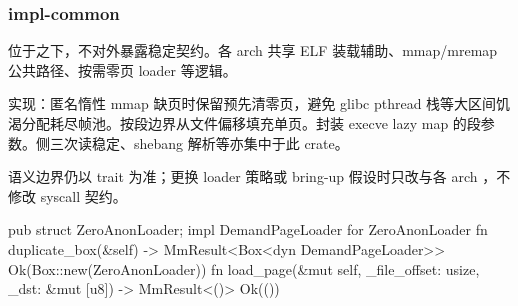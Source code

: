 
\subsubsection{impl-common}

位于之下，不对外暴露稳定契约。各 arch 共享 ELF 装载辅助、mmap/mremap 公共路径、按需零页 loader 等逻辑。

实现：匿名惰性 mmap 缺页时保留预先清零页，避免 glibc pthread 栈等大区间饥渴分配耗尽帧池。按段边界从文件偏移填充单页。封装 execve lazy map 的段参数。侧三次读稳定、shebang 解析等亦集中于此 crate。

语义边界仍以 trait 为准；更换 loader 策略或 bring-up 假设时只改与各 arch ，不修改 syscall 契约。

\begin{rustcode}
pub struct ZeroAnonLoader;
impl DemandPageLoader for ZeroAnonLoader {
    fn duplicate_box(&self) -> MmResult<Box<dyn DemandPageLoader>> {
        Ok(Box::new(ZeroAnonLoader))
    }
    fn load_page(&mut self, _file_offset: usize, _dst: &mut [u8]) -> MmResult<()> {
        Ok(())
    }
}
\end{rustcode}
